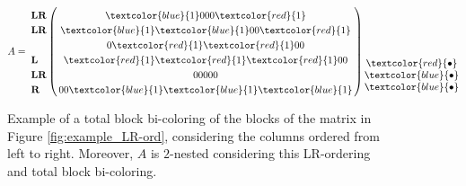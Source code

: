 \documentclass[12pt]{book}
\theoremstyle{plain}
\theoremstyle{remark}
\begin{document}
\begin{figure}
\begin{align*}
	A = \bordermatrix{  &  \cr
	\textbf{LR} &  \textcolor{blue}{1}  0  0  0  \textcolor{red}{1} \cr
	\textbf{LR} &  \textcolor{blue}{1}   \textcolor{blue}{1}  0  0   \textcolor{red}{1} \cr
					 & 0  \textcolor{red}{1}  \textcolor{red}{1}  0  0 \cr
	\textbf L &  \textcolor{red}{1}   \textcolor{red}{1}   \textcolor{red}{1}  0  0 \cr
	\textbf{LR} &  0   0   0   0   0 \cr
	\textbf R & 0  0  \textcolor{blue}{1}  \textcolor{blue}{1}  \textcolor{blue}{1} } \,
	\begin{matrix}
	\\ \\  \\  \\  \textcolor{red}{\bullet} \\ \textcolor{blue}{\bullet} \\ \textcolor{blue}{\bullet} \\
	\end{matrix}
\end{align*}
\caption{Example of a total block bi-coloring of the blocks of the matrix in Figure \ref{fig:example_LR-ord}, considering the columns ordered from left to right. Moreover, $A$ is $2$-nested considering this LR-ordering and total block bi-coloring.}
\end{figure}
\end{document}
